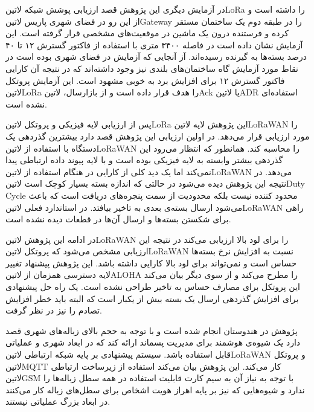 در آزمایش دیگری این پژوهش قصد ارزیابی پوشش شبکه ‌لاتین{LoRa} را داشته است و از این رو در فضای شهری پاریس ‌لاتین{Gateway} را در طبقه دوم یک ساختمان مستقر کرده و فرستنده
درون یک ماشین در موقعیت‌های مشخصی قرار گرفته است. این آزمایش نشان داده است در فاصله ۳۴۰۰ متری با استفاده از فاکتور گسترش ۱۲ تا ۴۰ درصد بسته‌ها به گیرنده رسیده‌اند.
آز آنجایی که آزمایش در فضای شهری بوده است در نقاط مورد آزمایش گاه ساختمان‌های بلندی نیز وجود داشته‌اند که در نتیجه آن کارایی فاکتور گسترش ۱۲ برای افزایش برد به خوبی مشهود است.
این آزمایش پروتکل ‌لاتین{LoRa} را هدف قرار داده است و از بازارسال، ‌لاتین{Ack} یا ‌لاتین{ADR} استفاده‌ای نشده است.

پس از ارزیابی لایه فیزیکی و پروتکل ‌لاتین{LoRa} این پژوهش لایه ‌لاتین{LoRaWAN} را مورد ارزیابی قرار می‌دهد. در اولین ارزیابی این پژوهش قصد دارد بیشترین گذردهی یک دستگاه
با استفاده از ‌لاتین{LoRaWAN} را محاسبه کند. همانطور که انتظار می‌رود این گذردهی بیشتر وابسته به لایه فیزیکی بوده است و با لایه پیوند داده ارتباطی پیدا نمی‌کند اما یک دید کلی از
کارایی در هنگام استفاده از ‌لاتین{LoRaWAN} می‌دهد. در نتیجه این پژوهش دیده می‌شود در حالتی که اندازه بسته بسیار کوچک است ‌لاتین{Duty Cycle} محدود کننده نیست بلکه
محدودیت از سمت پنجره‌های دریافت است که باعث می‌شود ارسال بسته‌ی بعدی به تاخیر بیافتد. در استاندارد فعلی ‌لاتین{LoRaWAN} راهی برای شکستن بسته‌ها و ارسال آن‌ها در قطعات دیده نشده است.

در ادامه این پژوهش ‌لاتین{LoRaWAN} را برای لود بالا ارزیابی می‌کند در نتیجه این ارزیابی مشخص می‌شود که پروتکل ‌لاتین{LoRaWAN} نسبت به افزایش نرخ بسته‌ها حساس است و نمی‌تواند برای لود بالا کارایی داشته باشد.
این پژوهش پیشنهاد تغییر لایه دسترسی همزمان از ‌لاتین{ALOHA} را مطرح می‌کند و از سوی دیگر بیان می‌کند این پروتکل برای مصارف حساس به تاخیر طراحی نشده است. یک راه حل پیشنهادی برای افزایش گذردهی ارسال یک بسته
بیش از یکبار است که البته باید خطر افزایش تصادم را نیز در نظر گرفت.


پژوهش  در هندوستان انجام شده است و با توجه به حجم بالای زباله‌های شهری قصد دارد یک شیوه‌ی هوشمند برای مدیریت پسماند ارائه کند که در ابعاد شهری و عملیاتی قابل استفاده باشد.
سیستم پیشنهادی بر پایه شبکه ارتباطی ‌لاتین{LoRaWAN} و پروتکل ‌لاتین{MQTT} کار می‌کند. این پژوهش بیان می‌کند استفاده از زیرساخت ارتباطی ‌لاتین{GSM} با توجه به نیاز آن به سیم کارت قابلیت
استفاده در همه سطل زباله‌ها را ندارد و شیوه‌هایی که نیز بر پایه اهراز هویت اشخاص برای سطل‌های زباله کار می‌کنند در ابعاد بزرگ عملیاتی نیستند.


